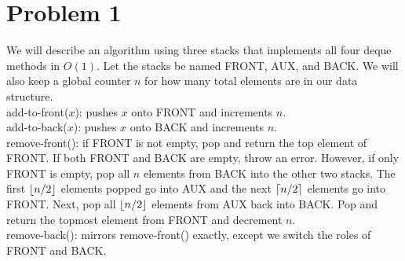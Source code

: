 \documentclass{article}
\DeclarePairedDelimiter{\floor}{\lfloor}{\rfloor}
\DeclarePairedDelimiter{\ceil}{\lceil}{\rceil}
\theoremstyle{casestyle}
\begin{document}
\section *{Problem 1}
We will describe an algorithm using three stacks that implements all four deque methods in $O(1)$. Let the stacks be named FRONT, AUX, and BACK. We will also keep a global counter $n$ for how many total elements are in our data structure. \\

add-to-front($x$): pushes $x$ onto FRONT and increments $n$. \\
add-to-back($x$): pushes $x$ onto BACK and increments $n$. \\
remove-front(): if FRONT is not empty, pop and return the top element of FRONT. If both FRONT and BACK are empty, throw an error. However, if only FRONT is empty, pop all $n$ elements from BACK into the other two stacks. The first $\floor*{n/2}$ elements popped go into AUX and the next $\ceil*{n/2}$ elements go into FRONT. Next, pop all $\floor*{n/2}$ elements from AUX back into BACK. Pop and return the topmost element from FRONT and decrement $n$. \\
remove-back(): mirrors remove-front() exactly, except we switch the roles of FRONT and BACK.\\
\end{document}
